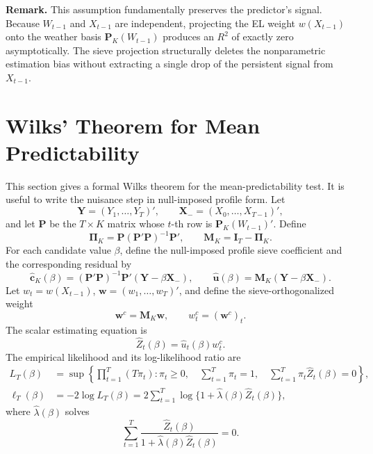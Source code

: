 \documentclass{article}
\begin{document}
\noindent \textbf{Remark.} This assumption fundamentally preserves the predictor's signal. Because $W_{t-1}$ and $X_{t-1}$ are independent, projecting the EL weight $w(X_{t-1})$ onto the weather basis $\bm{P}_K(W_{t-1})$ produces an $R^2$ of exactly zero asymptotically. The sieve projection structurally deletes the nonparametric estimation bias without extracting a single drop of the persistent signal from $X_{t-1}$.

\section{Wilks' Theorem for Mean Predictability}
\label{sec:mean-wilks}

This section gives a formal Wilks theorem for the mean-predictability test.  It is
useful to write the nuisance step in null-imposed profile form.  Let
\[
    \bm Y=(Y_1,\ldots,Y_T)',\qquad
    \bm X_-=(X_0,\ldots,X_{T-1})',
\]
and let \(\bm P\) be the \(T\times K\) matrix whose \(t\)-th row is
\(\bm P_K(W_{t-1})'\).  Define
\[
    \bm\Pi_K=\bm P(\bm P'\bm P)^{-1}\bm P',
    \qquad
    \bm M_K=\bm I_T-\bm\Pi_K.
\]
For each candidate value \(\beta\), define the null-imposed profile sieve
coefficient and the corresponding residual by
\begin{equation}
    \widehat{\bm c}_K(\beta)
    =(\bm P'\bm P)^{-1}\bm P'(\bm Y-\beta\bm X_-),
    \qquad
    \widehat{\bm u}(\beta)
    =\bm M_K(\bm Y-\beta\bm X_-).
    \label{eq:profile-sieve}
\end{equation}
Let \(w_t=w(X_{t-1})\), \(\bm w=(w_1,\ldots,w_T)'\), and define the
sieve-orthogonalized weight
\begin{equation}
    \bm w^c=\bm M_K\bm w,
    \qquad
    w_t^c=(\bm w^c)_t.
    \label{eq:sieve-weight}
\end{equation}
The scalar estimating equation is
\begin{equation}
    \widehat Z_t(\beta)
    =\widehat u_t(\beta)w_t^c.
    \label{eq:profile-score}
\end{equation}
The empirical likelihood and its log-likelihood ratio are
\begin{align}
    L_T(\beta)
    &=\sup\left\{
       \prod_{t=1}^T(T\pi_t):
       \pi_t\geq0,\quad
       \sum_{t=1}^T\pi_t=1,\quad
       \sum_{t=1}^T\pi_t\widehat Z_t(\beta)=0
       \right\},                                                    \label{eq:profile-el}\\
    \ell_T(\beta)
    &=-2\log L_T(\beta)
      =2\sum_{t=1}^T\log\{1+\widehat\lambda(\beta)
          \widehat Z_t(\beta)\},                                    \label{eq:profile-elr}
\end{align}
where \(\widehat\lambda(\beta)\) solves
\begin{equation}
    \sum_{t=1}^T
       \frac{\widehat Z_t(\beta)}
            {1+\widehat\lambda(\beta)\widehat Z_t(\beta)}=0.
    \label{eq:lambda-equation}
\end{equation}
\end{document}
